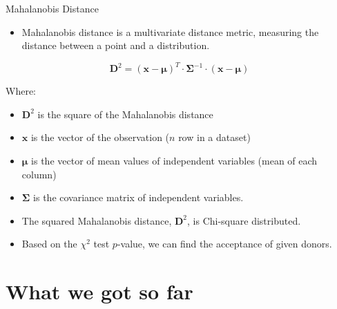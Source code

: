 \documentclass[
  8pt,
  ignorenonframetext,
]{beamer}
\providecommand{\tightlist}{%
  \setlength{\itemsep}{0pt}\setlength{\parskip}{0pt}}
\begin{document}
\begin{frame}{Mahalanobis Distance}
\protect\hypertarget{mahalanobis-distance}{}
\begin{itemize}
\tightlist
\item
  Mahalanobis distance is a multivariate distance metric, measuring the
  distance between a point and a distribution.
\end{itemize}

\[
\pmb D^2 = (\pmb x - \pmb \mu)^T \cdot \pmb \Sigma^{-1} \cdot (\pmb x - \pmb \mu)
\]

Where:

\begin{itemize}
\item
  \(\pmb D^2\) is the square of the Mahalanobis distance
\item
  \(\pmb x\) is the vector of the observation (\(n\) row in a dataset)
\item
  \(\pmb \mu\) is the vector of mean values of independent variables
  (mean of each column)
\item
  \(\pmb \Sigma\) is the covariance matrix of independent variables.
\item
  The squared Mahalanobis distance, \(\pmb D^2\), is Chi-square
  distributed.
\item
  Based on the \(\chi^2\) test \(p\)-value, we can find the acceptance
  of given donors.
\end{itemize}
\end{frame}

\hypertarget{what-we-got-so-far}{%
\section{What we got so far}\label{what-we-got-so-far}}
\end{document}
